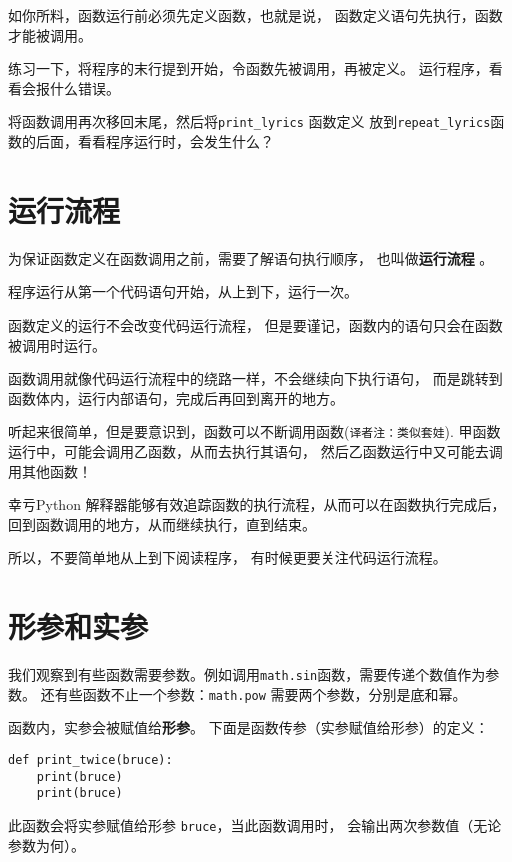 \documentclass[10pt]{book}
\begin{document}
如你所料，函数运行前必须先定义函数，也就是说，
函数定义语句先执行，函数才能被调用。

练习一下，将程序的末行提到开始，令函数先被调用，再被定义。
运行程序，看看会报什么错误。

将函数调用再次移回末尾，然后将\verb"print_lyrics" 函数定义
放到\verb"repeat_lyrics"函数的后面，看看程序运行时，会发生什么？

\section{运行流程}

为保证函数定义在函数调用之前，需要了解语句执行顺序，
也叫做{\bf 运行流程 }。

程序运行从第一个代码语句开始，从上到下，运行一次。

函数定义的运行不会改变代码运行流程，
但是要谨记，函数内的语句只会在函数被调用时运行。

函数调用就像代码运行流程中的绕路一样，不会继续向下执行语句，
而是跳转到函数体内，运行内部语句，完成后再回到离开的地方。

听起来很简单，但是要意识到，函数可以不断调用函数({\tt 译者注：类似套娃}).
甲函数运行中，可能会调用乙函数，从而去执行其语句，
然后乙函数运行中又可能去调用其他函数！

幸亏Python 解释器能够有效追踪函数的执行流程，从而可以在函数执行完成后，
回到函数调用的地方，从而继续执行，直到结束。

所以，不要简单地从上到下阅读程序，
有时候更要关注代码运行流程。


\section{形参和实参}
\label{parameters}

我们观察到有些函数需要参数。例如调用{\tt math.sin}函数，需要传递个数值作为参数。
还有些函数不止一个参数：{\tt math.pow} 需要两个参数，分别是底和幂。

函数内，实参会被赋值给{\bf 形参}。
下面是函数传参（实参赋值给形参）的定义：

\begin{verbatim}
def print_twice(bruce):
    print(bruce)
    print(bruce)
\end{verbatim}
%
此函数会将实参赋值给形参 {\tt bruce}，当此函数调用时，
会输出两次参数值（无论参数为何）。
\end{document}
